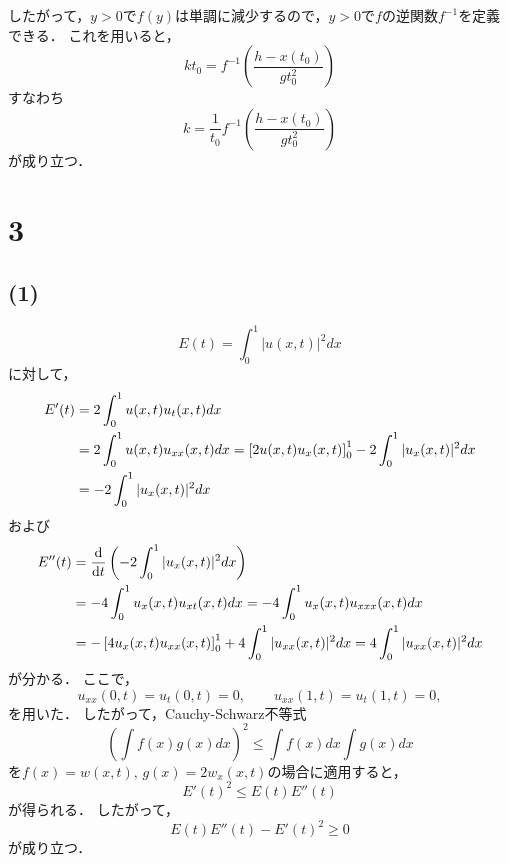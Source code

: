 \documentclass[a4paper,11pt]{jsarticle}
\begin{document}
したがって，$y>0$で$f(y)$は単調に減少するので，$y>0$で$f$の逆関数$f^{-1}$を定義できる．
これを用いると，
\begin{equation}
  kt_0 = f^{-1}\left(\frac{h-x(t_0)}{gt_0^2}\right)
\end{equation}
すなわち
\begin{equation}
  k = \frac{1}{t_0}f^{-1}\left(\frac{h-x(t_0)}{gt_0^2}\right)
\end{equation}
が成り立つ．

\section*{3}
\subsection*{(1)}
\begin{equation}
  E(t) = \int_0^1 |u(x,t)|^2 dx
\end{equation}
に対して，
\begin{align}
  E'(t) &= 2\int_0^1 u(x,t) u_t(x,t) dx \\
  &= 2\int_0^1 u(x,t) u_{xx}(x,t) dx = \left[2u(x,t)u_x(x,t)\right]_0^1 - 2 \int_0^1 |u_x(x,t)|^2 dx \notag\\
  &= - 2 \int_0^1 |u_x(x,t)|^2 dx
\end{align}
および
\begin{align}
  E''(t) &= \dv{}{t} \left(- 2 \int_0^1 |u_x(x,t)|^2 dx\right) \notag\\
  &= - 4 \int_0^1 u_x(x,t)u_{xt}(x,t) dx = - 4 \int_0^1 u_x(x,t)u_{xxx}(x,t) dx \notag\\
  &= -\left[4u_x(x,t)u_{xx}(x,t)\right]_0^1 + 4\int_0^1 |u_{xx}(x,t)|^2 dx = 4\int_0^1 |u_{xx}(x,t)|^2 dx
\end{align}
が分かる．
ここで，
\begin{equation}
  u_{xx}(0,t) = u_{t}(0,t) = 0,\qquad u_{xx}(1,t) = u_{t}(1,t) = 0,
\end{equation}
を用いた．
したがって，Cauchy-Schwarz不等式
\begin{equation}
  \left(\int f(x) g(x) dx\right)^2 \le \int f(x)dx \int g(x)dx
\end{equation}
を$f(x)=w(x,t),\,g(x)=2w_x(x,t)$の場合に適用すると，
\begin{equation}
  E'(t)^2 \le E(t) E''(t)
\end{equation}
が得られる．
したがって，
\begin{equation}
  E(t)E''(t) - E'(t)^2 \ge 0
\end{equation}
が成り立つ．
\end{document}
